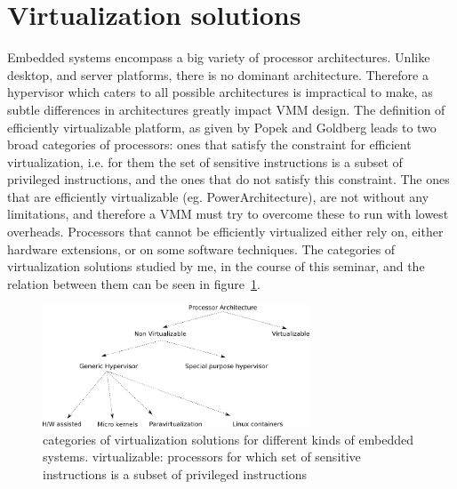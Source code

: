 \documentclass[a4paper,10pt]{article}
\begin{document}
\section{Virtualization solutions}
Embedded systems encompass a big variety of processor architectures. Unlike desktop, and server platforms, there is no dominant architecture. 
Therefore a hypervisor which caters to all possible architectures is impractical to make, as subtle differences in architectures greatly impact VMM design. The definition of efficiently virtualizable platform, as given by Popek and Goldberg\cite{Popek:1974:FRV:361011.361073} leads to
 two broad categories of processors: ones that satisfy the constraint for efficient virtualization, i.e. for them the set of sensitive instructions is a subset of privileged instructions, 
 and the ones that do not satisfy this constraint. The ones that are efficiently virtualizable (eg. PowerArchitecture), are not without any limitations, and therefore a VMM must try to overcome these
 to run with lowest overheads. Processors that cannot be efficiently virtualized either rely on, either hardware extensions, or on some software techniques. The categories of
 virtualization solutions studied by me, in the course of this seminar, and the relation between them can be seen in figure~\ref{fig:papers}.
\\
 \begin{figure}[ht]
 \centering
 \includegraphics[width=300px]{papers}
 \caption{categories of virtualization solutions for different kinds of embedded systems. \footnotesize{ virtualizable: processors for which set of sensitive instructions is a subset of
 privileged instructions} \label{fig:papers}}
 \end{figure}
    
\end{document}
